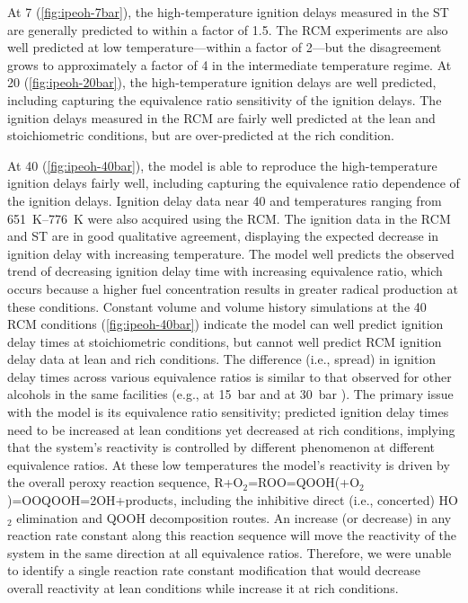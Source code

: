 \documentclass[../main.tex]{subfiles}
\begin{document}
At \SI{7}{\atmosphere} (\cref{fig:ipeoh-7bar}), the high-temperature ignition delays
measured in the ST are generally predicted to within a factor of 1.5. The RCM experiments
are also well predicted at low temperature---within a factor of 2---but
the disagreement grows to approximately a factor of 4 in the
intermediate temperature regime. At \SI{20}{\atmosphere} (\cref{fig:ipeoh-20bar}), the
high-temperature ignition delays are well predicted, including
capturing the equivalence ratio sensitivity of the ignition delays.
The ignition delays measured in the RCM are fairly well predicted
at the lean and stoichiometric conditions, but are over-predicted
at the rich condition.

At \SI{40}{\atmosphere} (\cref{fig:ipeoh-40bar}), the model is able to
reproduce the high-temperature ignition delays fairly well, including
capturing the equivalence ratio dependence of the ignition delays.
Ignition delay data near \SI{40}{\atmosphere} and temperatures
ranging from \SIrange{651}{776}{\kelvin} were also acquired using the
RCM. The ignition data in the RCM and ST are in good qualitative
agreement, displaying the expected decrease in ignition delay with
increasing temperature. The model well predicts the observed trend
of decreasing ignition delay time with increasing equivalence
ratio, which occurs because a higher fuel concentration results
in greater radical production at these conditions. Constant volume
and volume history simulations at the \SI{40}{\atmosphere} RCM
conditions (\cref{fig:ipeoh-40bar}) indicate the model can well predict
ignition delay times at stoichiometric conditions, but cannot well predict
RCM ignition delay data at lean and rich conditions. The difference
(i.e., spread) in ignition delay times across various equivalence ratios
is similar to that observed for other alcohols in the same facilities
(e.g., \nBuOH{} at \SI{15}{\bar} \cite{Weber2011} and \tBuOH{} at
\SI{30}{\bar} \cite{Weber2013}). The primary issue with the model is
its equivalence ratio sensitivity; predicted ignition delay times need
to be increased at lean conditions yet decreased at rich conditions,
implying that the system’s reactivity is controlled by different phenomenon
at different equivalence ratios. At these low temperatures the model’s
reactivity is driven by the overall peroxy reaction sequence,
R+O$_2$=ROO=QOOH(+O$_2$)=OOQOOH=2OH+products, including the inhibitive
direct (i.e., concerted) HO$_2$ elimination and QOOH decomposition routes.
An increase (or decrease) in any reaction rate constant along this
reaction sequence will move the reactivity of the system in the same
direction at all equivalence ratios. Therefore, we were unable to
identify a single reaction rate constant modification that would decrease
overall reactivity at lean conditions while increase it at rich conditions.
\end{document}
